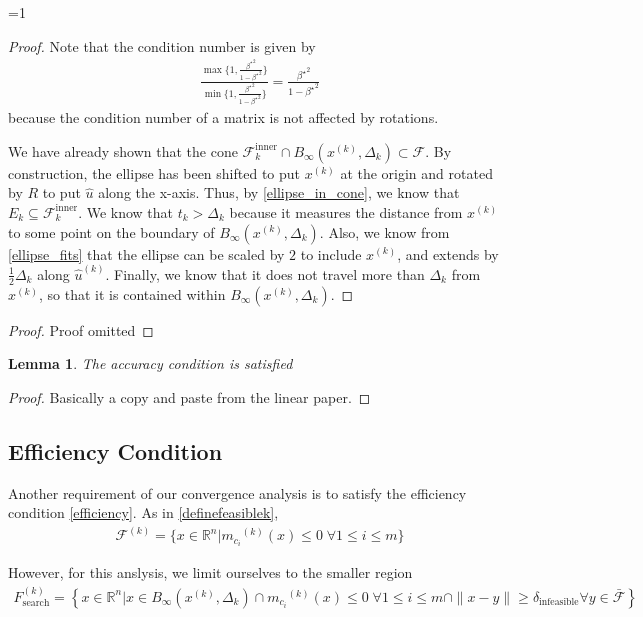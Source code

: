 \documentclass{article}
\newtheorem{lemma}[theorem]{Lemma}
\theoremstyle{case}
\newcommand{\xk}{{x^{(k)}}}
\newcommand{\Rn}{\mathbb R^n}
\newcommand{\dk}{\Delta_k}
\newcommand{\mcik}{{{m}_{c_i}}^{(k)}}
\newcommand{\feasible}{{\mathcal F}}
\newcommand{\feasiblek}{{\mathcal F^{(k)}}}
\newcommand{\huk}{{{\hat u}^{(k)}}}
\newcommand{\bs}{{\beta^{\star}}}
\newcommand{\fcki}{{\mathcal {F}^{\text{inner}}_k}}
\newcommand{\trstol}{{\delta_\text{infeasible}}}
\newcommand{\trsfesset}{{F^{(k)}_\text{search}}}
\newcommand{\tr}{{ B_{\infty}\left(\xk, \dk\right) }}
\def\includeproofs{1}
\begin{document}
\ifnum\includeproofs=1
\begin{proof}
Note that the condition number is given by
\begin{align*}
\frac{\max\{1, \frac{\bs^2}{1 - \bs^2}\}}{\min\{1, \frac{\bs^2}{1 - \bs^2}\}} = \frac{\bs^2}{1 - \bs^2}
\end{align*}
because the condition number of a matrix is not affected by rotations.

We have already shown that the cone $\fcki \cap \tr \subset \feasible$.
By construction, the ellipse has been shifted to put $\xk$ at the origin and rotated by $R$ to put $\hat u$ along the x-axis.
Thus, by \cref{ellipse_in_cone}, we know that $E_k \subseteq \fcki$.
We know that $t_k > \dk$ because it measures the distance from $\xk$ to some point on the boundary of $\tr$.
Also, we know from \cref{ellipse_fits} that the ellipse can be scaled by $2$ to include $\xk$, and extends by $\frac 1 2 \dk$ along $\huk$.
Finally, we know that it does not travel more than $\dk$ from $\xk$, so that it is contained within $\tr$.
\end{proof}
\else
\begin{proof}
Proof omitted
\end{proof}
\fi

\begin{lemma}
The accuracy condition is satisfied
\end{lemma}

\begin{proof}
Basically a copy and paste from the linear paper.
\end{proof}

\subsection{Efficiency Condition}
\label{efficiency_condition_analysis}

Another requirement of our convergence analysis is to satisfy the efficiency condition \cref{efficiency}.
As in \cref{definefeasiblek},
\begin{align*}
\feasiblek = \{x \in \Rn | \mcik(x) \le 0 \; \forall 1 \le i \le m \}
\end{align*}

However, for this anslysis, we limit ourselves to the smaller region
\begin{align}
\trsfesset = \left\{x \in \Rn | x \in \tr \cap \mcik(x) \le 0 \; \forall 1 \le i \le m\cap \|x - y \| \ge \trstol \forall y \in \bar \feasible\right\}
\end{align}
\end{document}
